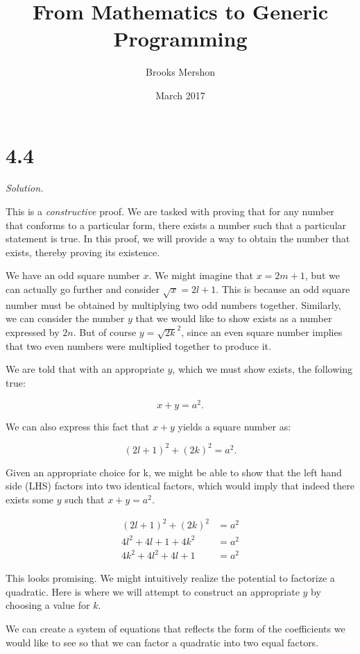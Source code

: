 \documentclass{article}
\title{From Mathematics to Generic Programming}
\author{Brooks Mershon}
\date{March 2017}
\begin{document}
\maketitle

\section*{4.4}

\textit{Solution.}

This is a \textit{constructive} proof. We are tasked with proving that for any number that conforms to a particular form, there exists a number such that a particular statement is true. In this proof, we will provide a way to obtain the number that exists, thereby proving its existence.

We have an odd square number $x$. We might imagine that $x = 2m + 1$, but we can actually go further and consider $\sqrt{x} = 2l + 1$. This is because an odd square number must be obtained by multiplying two odd numbers together. Similarly, we can consider the number $y$ that we would like to show exists as a number expressed by $2n$. But of course $y = \sqrt{2k}^2$, since an even square number implies that two even numbers were multiplied together to produce it.

We are told that with an appropriate $y$, which we must show exists, the following true:

$$x + y = a^2.$$

We can also express this fact that $x + y$ yields a square number as:

$$(2l + 1)^2 + (2k)^2 = a^2.$$

Given an appropriate choice for k, we might be able to show that the left hand side (LHS) factors into two identical factors, which would imply that indeed there exists some $y$ such that $x + y = a^2$.

\begin{align*}
(2l + 1)^2 + (2k)^2 &= a^2 \\
4l^2 + 4l + 1 + 4k^2 &= a^2 \\
4k^2 + 4l^2 + 4l + 1 &= a^2
\end{align*}

This looks promising. We might intuitively realize the potential to factorize a quadratic. Here is where we will attempt to construct an appropriate $y$ by choosing a value for $k$.

We can create a system of equations that reflects the form of the coefficients we would like to see so that we can factor a quadratic into two equal factors.
\end{document}
